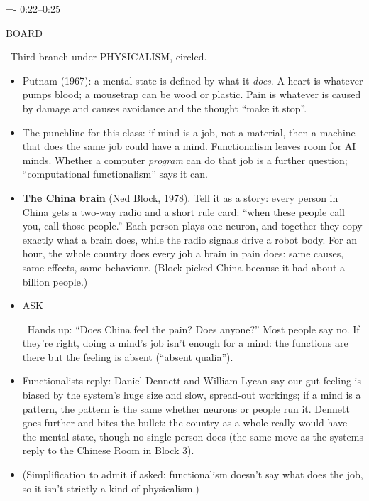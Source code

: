 \documentclass[11pt,letterpaper]{article}
\makeatletter
\newcommand{\keep}[1]{\par\penalty\z@\begingroup\dimen@=#1\relax\dimen@ii=\pagegoal\advance\dimen@ii-\pagetotal
  \ifdim\dimen@>\dimen@ii\ifdim\dimen@ii>\z@\vfil\break\fi\fi\endgroup}
\newcommand{\beat}[2]{\keep{3\baselineskip}\vspace{5pt}\noindent{\sffamily\bfseries #1}\hfill{\sffamily\small\color{muted}#2}\par\nopagebreak\vspace{1pt}}
\newcommand{\tagbox}[1]{\colorbox{tagbg}{\sffamily\scriptsize\bfseries\color{accent}\strut #1}}
\newcommand{\board}{\tagbox{BOARD}\ }
\newcommand{\ask}{\tagbox{ASK}\ }
\makeatother
\begin{document}
\beat{Functionalism and the China brain}{0:22--0:25}
\board Third branch under PHYSICALISM, circled.
\begin{itemize}
\item Putnam (1967): a mental state is defined by what it \emph{does}. A heart is whatever pumps blood; a mousetrap can be wood or plastic. Pain is whatever is caused by damage and causes avoidance and the thought ``make it stop''.
\item The punchline for this class: if mind is a job, not a material, then a machine that does the same job could have a mind. Functionalism leaves room for AI minds. Whether a computer \emph{program} can do that job is a further question; ``computational functionalism'' says it can.
\item \textbf{The China brain} (Ned Block, 1978). Tell it as a story: every person in China gets a two-way radio and a short rule card: ``when these people call you, call those people.'' Each person plays one neuron, and together they copy exactly what a brain does, while the radio signals drive a robot body. For an hour, the whole country does every job a brain in pain does: same causes, same effects, same behaviour. (Block picked China because it had about a billion people.)
\item \ask Hands up: ``Does China feel the pain? Does anyone?'' Most people say no. If they're right, doing a mind's job isn't enough for a mind: the functions are there but the feeling is absent (``absent qualia'').
\item Functionalists reply: Daniel Dennett and William Lycan say our gut feeling is biased by the system's huge size and slow, spread-out workings; if a mind is a pattern, the pattern is the same whether neurons or people run it. Dennett goes further and bites the bullet: the country as a whole really would have the mental state, though no single person does (the same move as the systems reply to the Chinese Room in Block 3).
\item (Simplification to admit if asked: functionalism doesn't say what does the job, so it isn't strictly a kind of physicalism.)
\end{itemize}
\end{document}
